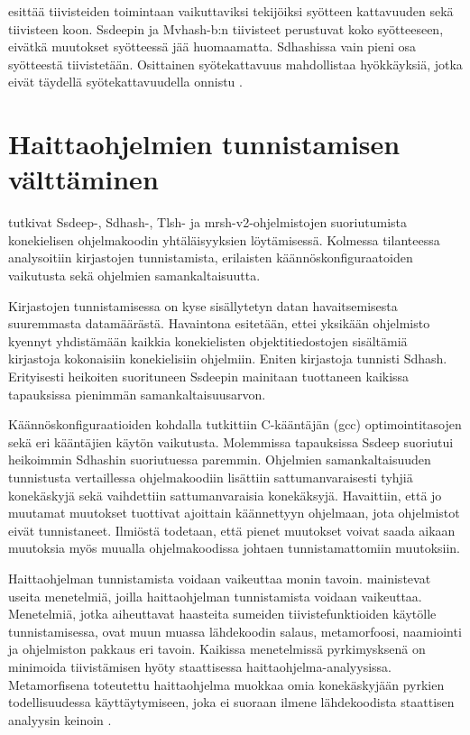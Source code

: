 \textcite{martin-perez21} esittää tiivisteiden toimintaan
vaikuttaviksi tekijöiksi syötteen kattavuuden sekä
tiivisteen koon. Ssdeepin ja Mvhash-b:n tiivisteet
perustuvat koko syötteeseen, eivätkä muutokset syötteessä
jää huomaamatta. Sdhashissa vain pieni osa syötteestä tiivistetään.
Osittainen syötekattavuus mahdollistaa hyökkäyksiä, jotka eivät
täydellä syötekattavuudella onnistu \parencite{martin-perez21}.

\section{Haittaohjelmien tunnistamisen välttäminen}

\textcite{pagani18} tutkivat Ssdeep-, Sdhash-, Tlsh- ja mrsh-v2-ohjelmistojen
suoriutumista konekielisen ohjelmakoodin yhtäläisyyksien löytämisessä.
Kolmessa tilanteessa analysoitiin kirjastojen tunnistamista,
erilaisten käännöskonfiguraatoiden vaikutusta sekä ohjelmien samankaltaisuutta.

Kirjastojen tunnistamisessa on kyse sisällytetyn datan havaitsemisesta
suuremmasta datamäärästä. Havaintona esitetään, ettei yksikään
ohjelmisto kyennyt yhdistämään kaikkia konekielisten objektitiedostojen
sisältämiä kirjastoja kokonaisiin konekielisiin ohjelmiin. Eniten
kirjastoja tunnisti Sdhash. Erityisesti heikoiten suorituneen Ssdeepin
mainitaan tuottaneen kaikissa tapauksissa pienimmän samankaltaisuusarvon.

Käännöskonfiguraatioiden kohdalla tutkittiin C-kääntäjän (gcc)
optimointitasojen sekä eri kääntäjien käytön vaikutusta. Molemmissa
tapauksissa Ssdeep suoriutui heikoimmin Sdhashin suoriutuessa
paremmin. Ohjelmien samankaltaisuuden tunnistusta vertaillessa
ohjelmakoodiin lisättiin sattumanvaraisesti tyhjiä konekäskyjä
sekä vaihdettiin sattumanvaraisia konekäksyjä. Havaittiin,
että jo muutamat muutokset tuottivat ajoittain käännettyyn
ohjelmaan, jota ohjelmistot eivät tunnistaneet. Ilmiöstä
todetaan, että pienet muutokset voivat saada aikaan
muutoksia myös muualla ohjelmakoodissa johtaen
tunnistamattomiin muutoksiin.

Haittaohjelman tunnistamista voidaan vaikeuttaa monin tavoin.
\textcite{aslan20} mainistevat useita menetelmiä, joilla haittaohjelman
tunnistamista voidaan vaikeuttaa. Menetelmiä, jotka aiheuttavat haasteita
sumeiden tiivistefunktioiden käytölle tunnistamisessa, ovat muun muassa
lähdekoodin salaus, metamorfoosi, naamiointi ja ohjelmiston pakkaus eri tavoin.
Kaikissa menetelmissä pyrkimysksenä on minimoida tiivistämisen hyöty
staattisessa haittaohjelma-analyysissa. Metamorfisena toteutettu haittaohjelma
muokkaa omia konekäskyjään pyrkien todellisuudessa käyttäytymiseen,
joka ei suoraan ilmene lähdekoodista staattisen analyysin keinoin \parencite{aslan20}.

